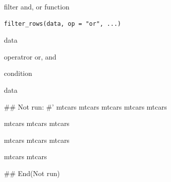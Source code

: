 \documentclass[a4paper]{book}
\begin{document}
%
\begin{Description}
filter and,  or function
\end{Description}
%
\begin{Usage}
\begin{verbatim}
filter_rows(data, op = "or", ...)
\end{verbatim}
\end{Usage}
%
\begin{Arguments}
\begin{ldescription}
\item[\code{data}] data

\item[\code{op}] operatror or, and

\item[\code{...}] condition
\end{ldescription}
\end{Arguments}
%
\begin{Value}
data
\end{Value}
%
\begin{Examples}
\begin{ExampleCode}

\#\# Not run: 
#'
mtcars %
mtcars %
mtcars %
mtcars %
mtcars %

mtcars %
mtcars %
mtcars %

mtcars %
mtcars %
mtcars %

mtcars %
mtcars %

## End(Not run)

\end{ExampleCode}
\end{Examples}
\end{document}
